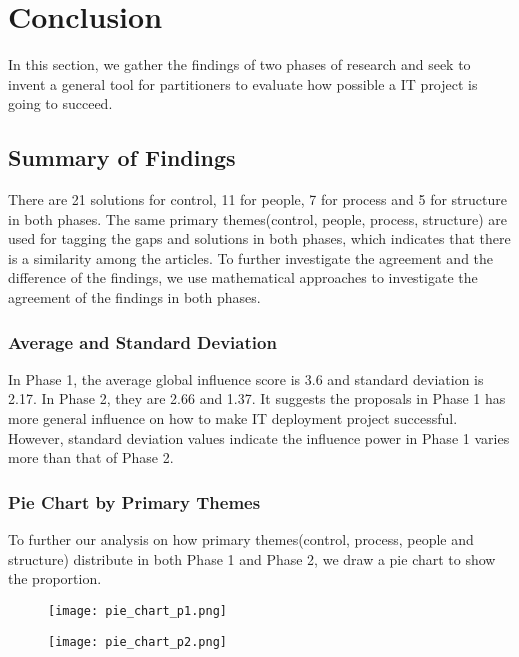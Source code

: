 
\section{Conclusion}
In this section, we gather the findings of two phases of research and seek to invent a general tool for partitioners to evaluate how possible a IT project is going to succeed.

\subsection{Summary of Findings}
There are 21 solutions for control, 11 for people, 7 for process and 5 for structure in both phases. The same primary themes(control, people, process, structure) are used for tagging the gaps and solutions in both phases, which indicates that there is a similarity among the articles. To further investigate the agreement and the difference of the findings, we use mathematical approaches to investigate the agreement of the findings in both phases.

\subsubsection{Average and Standard Deviation}
In Phase 1, the average global influence score is 3.6 and standard deviation
is 2.17. In Phase 2, they are 2.66 and 1.37. It suggests the proposals in Phase 1 has more general influence on how to make IT deployment project successful. However, standard deviation values indicate the influence power in Phase 1 varies more than that of Phase 2.
\subsubsection{Pie Chart by Primary Themes}
To further our analysis on how primary themes(control, process, people and structure) distribute in both Phase 1 and Phase 2, we draw a pie chart to show the proportion.

\begin{figure}[!ht]
\centering
\begin{minipage}{.5\textwidth}
  \centering
  \texttt{[image: pie\_chart\_p1.png]}
  \label{pie:1}
\end{minipage}%
\begin{minipage}{.5\textwidth}
  \centering
  \texttt{[image: pie\_chart\_p2.png]}
  \label{pie:2}
\end{minipage}
\end{figure}

